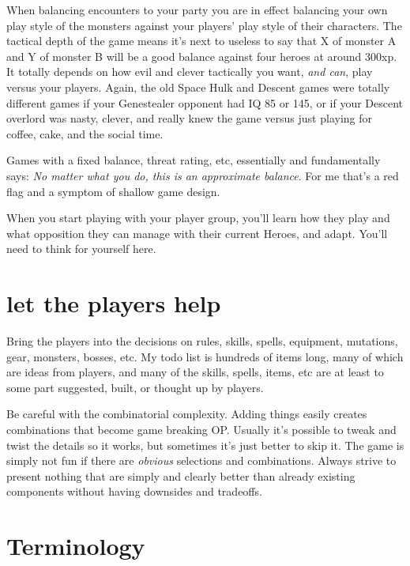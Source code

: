 When balancing encounters to your party you are in effect balancing your own play style of the monsters against your players' play style of their characters. The tactical depth of the game means it's next to useless to say that X of monster A and Y of monster B will be a good balance against four heroes at around 300xp. It totally depends on how evil and clever tactically you want, \emph{and can}, play versus your players. Again, the old Space Hulk and Descent games were totally different games if your Genestealer opponent had IQ 85 or 145, or if your Descent overlord was nasty, clever, and really knew the game versus just playing for coffee, cake, and the social time.

Games with a fixed balance, threat rating, etc, essentially and fundamentally says: \emph{No matter what you do, this is an approximate balance}. For me that's a red flag and a symptom of shallow game design.

When you start playing with your player group, you'll learn how they play and what opposition they can manage with their current Heroes, and adapt. You'll need to think for yourself here.


\section*{let the players help}
Bring the players into the decisions on rules, skills, spells, equipment, mutations, gear, monsters, bosses, etc. My todo list is hundreds of items long, many of which are ideas from players, and many of the skills, spells, items, etc are at least to some part suggested, built, or thought up by players.

Be careful with the combinatorial complexity. Adding things easily creates combinations that become game breaking OP. Usually it's possible to tweak and twist the details so it works, but sometimes it's just better to skip it. The game is simply not fun if there are \emph{obvious} selections and combinations. Always strive to present nothing that are simply and clearly better than already existing components without having downsides and tradeoffs.







\section*{Terminology}


